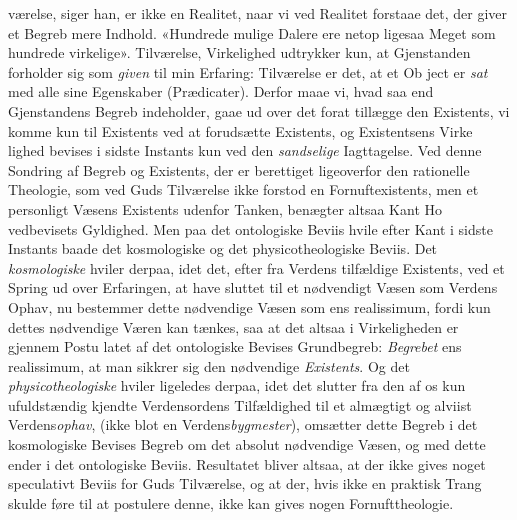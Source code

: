 \documentclass[12pt,a4paper]{book}
\begin{document}
værelse, siger han, er ikke en Realitet, naar vi ved Realitet
forstaae det, der giver et Begreb mere Indhold. «Hundrede
mulige Dalere ere netop ligesaa Meget som hundrede virkelige».
Tilværelse, Virkelighed udtrykker kun, at Gjenstanden forholder
sig som \emph{given} til min Erfaring: Tilværelse er det, at et Ob\-%
ject er \emph{sat} med alle sine Egenskaber (Prædicater). Derfor
maae vi, hvad saa end Gjenstandens Begreb indeholder, gaae
ud over det forat tillægge den Existents, vi komme kun til
Existents ved at forudsætte Existents, og Existentsens Virke\-%
lighed bevises i sidste Instants kun ved den \emph{sandselige}
Iagttagelse. Ved denne Sondring af Begreb og Existents, der
er berettiget ligeoverfor den rationelle Theologie, som ved Guds
Tilværelse ikke forstod en Fornuftexistents, men et personligt
Væsens Existents udenfor Tanken, benægter altsaa Kant Ho\-%
vedbevisets Gyldighed. Men paa det ontologiske Beviis hvile
efter Kant i sidste Instants baade det kosmologiske og det
physicotheologiske Beviis. Det \emph{kosmologiske} hviler derpaa,
idet det, efter fra Verdens tilfældige Existents, ved et Spring
ud over Erfaringen, at have sluttet til et nødvendigt Væsen
som Verdens Ophav, nu bestemmer dette nødvendige Væsen
som ens realissimum, fordi kun dettes nødvendige Væren kan
tænkes, saa at det altsaa i Virkeligheden er gjennem Postu\-%
latet af det ontologiske Bevises Grundbegreb: \emph{Begrebet} ens
realissimum, at man sikkrer sig den nødvendige \emph{Existents}.
Og det \emph{physicotheologiske} hviler ligeledes derpaa, idet
det slutter fra den af os kun ufuldstændig kjendte Verdensordens
Tilfældighed til et almægtigt og alviist Verdens\emph{ophav}, (ikke
blot en Verdens\emph{bygmester}), omsætter dette Begreb i det
kosmologiske Bevises Begreb om det absolut nødvendige Væsen,
og med dette ender i det ontologiske Beviis. Resultatet bliver
altsaa, at der ikke gives noget speculativt Beviis for Guds
Tilværelse, og at der, hvis ikke en praktisk Trang skulde føre
til at postulere denne, ikke kan gives nogen Fornufttheologie.
\end{document}
